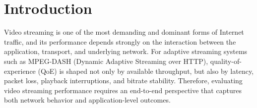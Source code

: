 \documentclass[journal]{IEEEtran}
\begin{document}
%




\section*{Introduction}
Video streaming is one of the most demanding and dominant forms of Internet traffic, and its performance depends strongly on the interaction between the application, transport, and underlying network. For adaptive streaming systems such as MPEG-DASH (Dynamic Adaptive Streaming over HTTP), quality-of-experience (QoE) is shaped not only by available throughput, but also by latency, packet loss, playback interruptions, and bitrate stability. Therefore, evaluating video streaming performance requires an end-to-end perspective that captures both network behavior and application-level outcomes.
\end{document}
